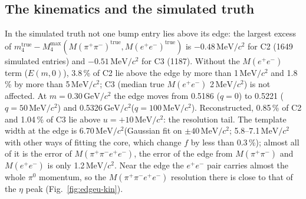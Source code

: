 \documentclass[11pt,a4paper]{article}
\newcommand{\piz}{\ensuremath{\pi^{0}}\xspace}
\newcommand{\ee}{\ensuremath{e^{+}e^{-}}\xspace}
\newcommand{\Mfour}{\ensuremath{M(\pi^{+}\pi^{-}e^{+}e^{-})}\xspace}
\newcommand{\Mee}{\ensuremath{M(e^{+}e^{-})}\xspace}
\newcommand{\Mpipi}{\ensuremath{M(\pi^{+}\pi^{-})}\xspace}
\newcommand{\GeVcc}{\ensuremath{\mathrm{GeV}/c^{2}}\xspace}
\newcommand{\MeVcc}{\ensuremath{\mathrm{MeV}/c^{2}}\xspace}
\begin{document}
\subsection{The kinematics and the simulated truth}
\label{sec:edgeu-kin}
In the simulated truth not one bump entry lies above its edge: the largest excess of $m_4^{\mathrm{true}}-M_4^{\max}(\Mpipi^{\mathrm{true}},
\Mee^{\mathrm{true}})$ is $-0.48$\,\MeVcc for C2 (1649 simulated entries) and $-0.51$\,\MeVcc for C3 (1187). Without the \Mee term ($E(m,0)$), 3.8\,\% of C2
lie above the edge by more than 1\,\MeVcc and 1.8\,\% by more than 5\,\MeVcc; C3 (median true \Mee 2\,\MeVcc) is not affected. At $m=0.30$\,\GeVcc
the edge moves from 0.5186 ($q=0$) to 0.5221 ($q=50$\,\MeVcc) and 0.5326\,\GeVcc ($q=100$\,\MeVcc). Reconstructed, 0.85\,\% of C2 and 1.04\,\% of C3
lie above $u=+10$\,\MeVcc: the resolution tail. The template width at the edge is 6.70\,\MeVcc (Gaussian fit on $\pm40$\,\MeVcc; 5.8--7.1\,\MeVcc
with other ways of fitting the core, which change $f$ by less than 0.3\,\%); almost all of it is the error of \Mfour, the error of the edge from
\Mpipi and \Mee is only 1.2\,\MeVcc. Near the edge the \ee pair carries almost the whole \piz momentum, so the \Mfour resolution there is close to
that of the $\eta$ peak (Fig.~\ref{fig:edgeu-kin}).
\end{document}
